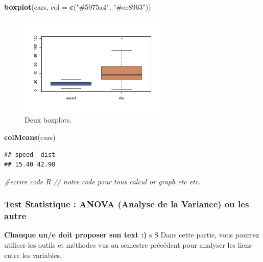 \documentclass[mstat,12pt]{unswthesis}
\newenvironment{Shaded}{\begin{snugshade}}{\end{snugshade}}
\newcommand{\AttributeTok}[1]{\textcolor[rgb]{0.13,0.29,0.53}{#1}}
\newcommand{\CommentTok}[1]{\textcolor[rgb]{0.56,0.35,0.01}{\textit{#1}}}
\newcommand{\FunctionTok}[1]{\textcolor[rgb]{0.13,0.29,0.53}{\textbf{#1}}}
\newcommand{\NormalTok}[1]{#1}
\newcommand{\StringTok}[1]{\textcolor[rgb]{0.31,0.60,0.02}{#1}}
\begin{document}
\begin{Shaded}
\begin{Highlighting}[]
\FunctionTok{boxplot}\NormalTok{(cars, }\AttributeTok{col =} \FunctionTok{c}\NormalTok{(}\StringTok{"\#5975a4"}\NormalTok{, }\StringTok{"\#cc8963"}\NormalTok{))}
\end{Highlighting}
\end{Shaded}

\begin{figure}

{\centering \includegraphics[width=7cm]{scdon2-UPV-report-template_sansPython_files/figure-latex/unnamed-chunk-4-1} 

}

\caption{\label{fig:boxplots}Deux boxplots.}\label{fig:unnamed-chunk-4}
\end{figure}

\begin{Shaded}
\begin{Highlighting}[]
\FunctionTok{colMeans}\NormalTok{(cars)}
\end{Highlighting}
\end{Shaded}

\begin{verbatim}
## speed  dist 
## 15.40 42.98
\end{verbatim}

\begin{Shaded}
\begin{Highlighting}[]
 \CommentTok{\#ecrire code R // notre code pour tous calcul or graph etc etc. }
\end{Highlighting}
\end{Shaded}

\subsubsection{Test Statistique : ANOVA (Analyse de la Variance) ou les
autre}\label{test-statistique-anova-analyse-de-la-variance-ou-les-autre-1}

\textbf{Chauque un/e doit proposer son text :) }s S Dans cette partie,
vous pourrez utiliser les outils et méthodes vus au semestre précédent
pour analyser les liens entre les variables.
\end{document}
